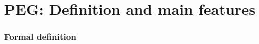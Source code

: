 \section{PEG: Definition and main features}
\begin{frame}
    \frametitle{Formal definition \cite{peg}}
\end{frame}